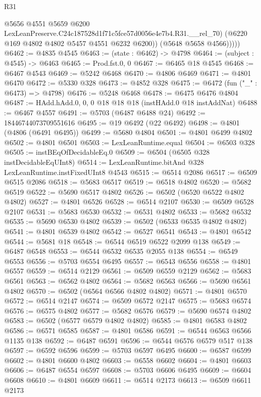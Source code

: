 \begin{lexlean}{R31}
\begin{coremodule}
                @5656
                @4551
                @5659
                @6200
                LexLeanPreserve.C24c187528d1f71c5fce57d0056e4e7b4.R31.__rel_70)
              (@6220 @169 @4802 @4802 @5457 @4551 @6232 @6200))
            (@5648 @5658 @4566)))))
@6462 := @4835 @4545
@6463 := (state : @6462) -> @4798
@6464 := (subject : @4545) -> @6463
@6465 := Prod.fst.{0, 0}
@6467 := @6465 @18 @4545
@6468 := @6467 @4543
@6469 := @5242 @6468
@6470 := @4806 @6469
@6471 := @4801 @6470
@6472 := @5330 @328
@6473 := @4852 @328
@6475 := @6472 (fun ("_" : @6473) => @4798)
@6476 := @5248 @6468
@6478 := @6475 @6476 @4804
@6487 := HAdd.hAdd.{0, 0, 0} @18 @18 @18 (instHAdd.{0} @18 instAddNat)
@6488 := @6467 @4557
@6491 := @5703 (@6487 @6488 @24)
@6492 := 18446744073709551616
@6495 := @19 @6492 (@22 @6492)
@6498 := @4801 (@4806 (@6491 @6495))
@6499 := @5680 @4804
@6501 := @4801 @6499 @4802
@6502 := @4801 @6501
@6503 := LexLeanRuntime.equal
@6504 := @6503 @328
@6505 := instBEqOfDecidableEq.{0}
@6509 := @6504 (@6505 @328 instDecidableEqUInt8)
@6514 := LexLeanRuntime.bitAnd @328 LexLeanRuntime.instFixedUInt8 @4543
@6515 := @6514 @2086
@6517 := @6509 @6515 @2086
@6518 := @5683 @6517
@6519 := @6518 @4802
@6520 := @5682 @6519
@6522 := @5690 @6517 @4802
@6526 := @6502 (@6520 @6522 @4802 @4802)
@6527 := @4801 @6526
@6528 := @6514 @2107
@6530 := @6509 @6528 @2107
@6531 := @5683 @6530
@6532 := @6531 @4802
@6533 := @5682 @6532
@6535 := @5690 @6530 @4802
@6539 := @6502 (@6533 @6535 @4802 @4802)
@6541 := @4801 @6539 @4802
@6542 := @6527 @6541
@6543 := @4801 @6542
@6544 := @5681 @18
@6548 := @6544 @6519 @6522 @2099 @138
@6549 := @6487 @6548
@6553 := @6544 @6532 @6535 @2055 @138
@6554 := @6549 @6553
@6556 := @5703 @6554 @6495
@6557 := @6543 @6556
@6558 := @4801 @6557
@6559 := @6514 @2129
@6561 := @6509 @6559 @2129
@6562 := @5683 @6561
@6563 := @6562 @4802
@6564 := @5682 @6563
@6566 := @5690 @6561 @4802
@6570 := @6502 (@6564 @6566 @4802 @4802)
@6571 := @4801 @6570
@6572 := @6514 @2147
@6574 := @6509 @6572 @2147
@6575 := @5683 @6574
@6576 := @6575 @4802
@6577 := @5682 @6576
@6579 := @5690 @6574 @4802
@6583 := @6502 (@6577 @6579 @4802 @4802)
@6585 := @4801 @6583 @4802
@6586 := @6571 @6585
@6587 := @4801 @6586
@6591 := @6544 @6563 @6566 @1135 @138
@6592 := @6487 @6591
@6596 := @6544 @6576 @6579 @517 @138
@6597 := @6592 @6596
@6599 := @5703 @6597 @6495
@6600 := @6587 @6599
@6602 := @4801 @6600 @4802
@6603 := @6558 @6602
@6604 := @4801 @6603
@6606 := @6487 @6554 @6597
@6608 := @5703 @6606 @6495
@6609 := @6604 @6608
@6610 := @4801 @6609
@6611 := @6514 @2173
@6613 := @6509 @6611 @2173

\end{coremodule}
\end{lexlean}
